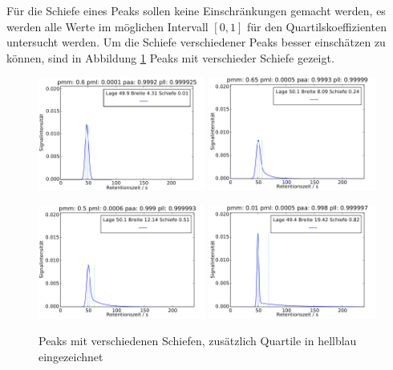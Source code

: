 Für die Schiefe eines Peaks sollen keine Einschränkungen gemacht werden, es werden alle Werte im möglichen Intervall $[0,1]$ für den Quartilskoeffizienten untersucht werden. Um die Schiefe verschiedener Peaks besser einschätzen zu können, sind in Abbildung \ref{diverse_schiefen} Peaks mit verschieder Schiefe gezeigt.

\begin{figure}
 \includegraphics[width=0.49\textwidth]{bilder/Schiefe/001_q}
 \includegraphics[width=0.49\textwidth]{bilder/Schiefe/025_q}

 \vspace{5pt}
 
 \includegraphics[width=0.49\textwidth]{bilder/Schiefe/05_q}
 \includegraphics[width=0.49\textwidth]{bilder/Schiefe/08_q}
\caption[Peaks mit verschiedenen Schiefen]{Peaks mit verschiedenen Schiefen, zusätzlich Quartile in hellblau eingezeichnet}
\label{diverse_schiefen}
\end{figure}

